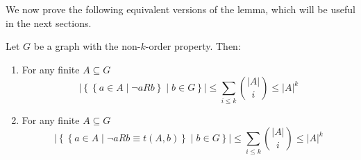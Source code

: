    We now prove the following equivalent versions of the lemma, which will be useful in the next sections.

    \corollary[Claim 2.6.1]\label{itm:2.6.1}
        Let $G$ be a graph with the non-$k$-order property.
        Then:
        \begin{enumerate}
            \item\label{itm:2.6.1.1} For any finite $A \subseteq G$
                $$
                    \left|\left\{ \left\{ a \in A \mid \neg a R b \right\} \mid b \in G \right\} \right|
                        \leq \sum_{i \leq k} \binom{|A|}{i} \leq |A|^k
                $$
            \item\label{itm:2.6.1.2} For any finite $A \subseteq G$
                $$
                    \left|\left\{ \left\{ a \in A \mid \neg a R b \equiv t(A,b) \right\} \mid b \in G \right\} \right|
                        \leq \sum_{i \leq k} \binom{|A|}{i} \leq |A|^k
                $$
        \end{enumerate}
